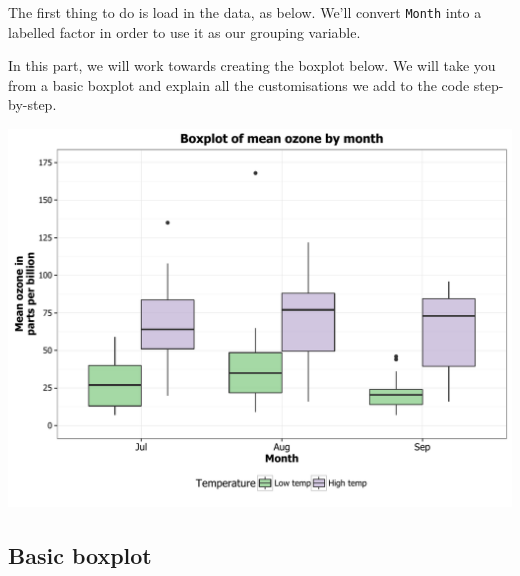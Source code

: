 \documentclass[]{article}
\newenvironment{Shaded}{\begin{snugshade}}{\end{snugshade}}
\newcommand{\KeywordTok}[1]{\textcolor[rgb]{0.13,0.29,0.53}{\textbf{{#1}}}}
\newcommand{\DataTypeTok}[1]{\textcolor[rgb]{0.13,0.29,0.53}{{#1}}}
\newcommand{\StringTok}[1]{\textcolor[rgb]{0.31,0.60,0.02}{{#1}}}
\newcommand{\NormalTok}[1]{{#1}}
\begin{document}
The first thing to do is load in the data, as below. We'll convert
\texttt{Month} into a labelled factor in order to use it as our grouping
variable.

\begin{Shaded}
\end{Shaded}

In this part, we will work towards creating the boxplot below. We will
take you from a basic boxplot and explain all the customisations we add
to the code step-by-step.

\begin{center}\includegraphics{0_all_posts_pdf/box_final-1} \end{center}

\subsection{Basic boxplot}\label{basic-boxplot}
\end{document}
